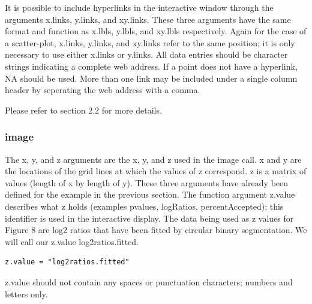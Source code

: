 \documentclass[]{article}
\begin{document}
\indent It is possible to include hyperlinks in the interactive window through the arguments x.links, y.links, and xy.links. These three arguments have the same format and function as x.lbls, y.lbls, and xy.lbls respectively. Again for the case of a scatter-plot,  x.links, y.links, and xy.links refer to the same position; it is only necessary to use either x.links or y.links. All data entries should be character strings indicating a complete web address. If a point does not have a hyperlink, NA should be used. More than one link may be included under a single column header by seperating the web address with a comma.\newline

\vspace{5mm}

 Please refer to section 2.2 for more details. 

\subsubsection{image}

\indent The x, y, and z arguments are the x, y, and z used in the image call. x and y are the locations of the grid lines at which the values of z correspond. z is a matrix of values (length of x  by length of y).  These three arguments have already been defined for the example in the previous section. The function argument z.value describes what z holds (examples pvalues, logRatios, percentAccepted); this identifier is used in the interactive display. The data being used as z values for Figure 8 are log2 ratios that have been fitted by circular binary segmentation. We will call our z.value log2ratios.fitted.

\begin{verbatim}
z.value = "log2ratios.fitted"
\end{verbatim}



 z.value should not contain any spaces or punctuation characters; numbers and letters only. \newline
\end{document}
